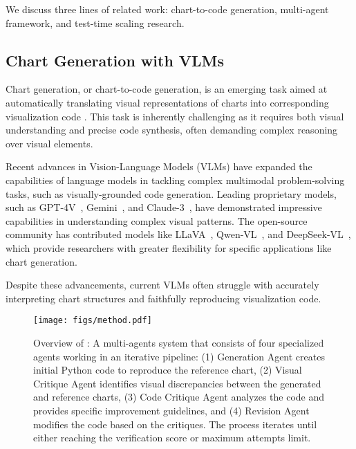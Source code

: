 \vspace{-0.02in}
We discuss three lines of related work: chart-to-code generation, multi-agent framework, and test-time scaling research.
\vspace{-0.01in}
\subsection{Chart Generation with VLMs}

Chart generation, or chart-to-code generation,  is an emerging task aimed at automatically translating visual representations of charts into corresponding visualization code \cite{shi2024chartmimic, wu2024plot2code}. This task is inherently challenging as it requires both visual understanding and precise code synthesis, often demanding complex reasoning over visual elements.

Recent advances in Vision-Language Models (VLMs) have expanded the capabilities of language models in tackling complex multimodal problem-solving tasks, such as visually-grounded code generation.
Leading proprietary models, such as GPT-4V~\cite{GPT4V}, Gemini~\cite{Gemini}, and Claude-3~\cite{Claude}, have demonstrated impressive capabilities in understanding complex visual patterns.
The open-source community has contributed models like LLaVA~\cite{xu2024llava-uhd, li2024llavanext-strong}, Qwen-VL~\cite{Qwen-VL}, and DeepSeek-VL~\cite{lu2024deepseekvl}, which provide researchers with greater flexibility for specific applications like chart generation.

Despite these advancements, current VLMs often struggle with accurately interpreting chart structures and faithfully reproducing visualization code. 

\begin{figure*}[ht]
    \centering
    \texttt{[image: figs/method.pdf]}
    \caption{Overview of \model{}: A multi-agents system that consists of four specialized agents working in an iterative pipeline: (1) Generation Agent creates initial Python code to reproduce the reference chart, (2) Visual Critique Agent identifies visual discrepancies between the generated and reference charts, (3) Code Critique Agent analyzes the code and provides specific improvement guidelines, and (4) Revision Agent modifies the code based on the critiques. The process iterates until either reaching the verification score or maximum attempts limit.} %
    \vspace{-0.1in}
    \label{fig:method}
\end{figure*}


